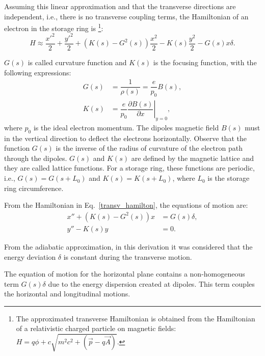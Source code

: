 Assuming this linear approximation and that the transverse directions are independent, i.e., there is no transverse coupling terms, the Hamiltonian of an electron in the storage ring is \footnote{The approximated transverse Hamiltonian is obtained from the Hamiltonian of a relativistic charged particle on magnetic fields: $H = q\phi + c\sqrt{m^2c^2 + \left(\vec{p} - q\vec{A}\right) }$.}:
\begin{equation}
    H \approx \dfrac{{x'}^2}{2} + \dfrac{{y'}^2}{2} + \left(K(s)- G^{2}(s)\right)\dfrac{{x}^2}{2} - K(s) \frac{y^2}{2} - G(s) x \delta.
    \label{transv_hamilton}
\end{equation}

$G(s)$ is called curvature function and $K(s)$ is the focusing function, with the following expressions:
\begin{align}
    G(s) &= \dfrac{1}{\rho(s)} = \dfrac{e}{p_0}B(s), \\
    K(s) &= \dfrac{e}{p_0}\left.\dfrac{\partial B(s)}{\partial x}\right|_{y=0},
\end{align}
where $p_0$ is the ideal electron momentum. The dipoles magnetic field $B(s)$ must in the vertical direction to deflect the electrons horizontally. Observe that the function $G(s)$ is the inverse of the radius of curvature of the electron path through the dipoles. $G(s)$ and $K(s)$ are defined by the magnetic lattice and they are called lattice functions. For a storage ring, these functions are periodic, i.e., $G(s) = G(s+L_0)$ and $K(s) = K(s+L_0)$, where $L_0$ is the storage ring circumference.


From the Hamiltonian in Eq.~\eqref{transv_hamilton}, the equations of motion are:
\begin{align}
    x'' + \left(K(s) - G^{2}(s)\right)x &= G(s) \delta, \\
    y'' - K(s)y &= 0.
\end{align}

From the adiabatic approximation, in this derivation it was considered that the energy deviation $\delta$ is constant during the transverse motion.

The equation of motion for the horizontal plane contains a non-homogeneous term $G(s)\delta$ due to the energy dispersion created at dipoles. This term couples the horizontal and longitudinal motions.


